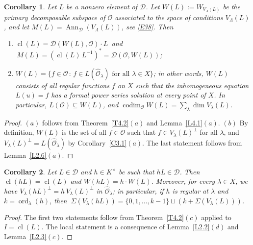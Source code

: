 \documentclass[11pt,reqno]{amsart}
\theoremstyle{plain}
\newtheorem{corollary}{Corollary}[section]
\theoremstyle{definition}
\theoremstyle{remark}
\numberwithin{equation}{section}
\newcommand{\cD}{\mathcal{D}}
\newcommand{\cO}{\mathcal{O}}
\newcommand{\hO}{\widehat{\cO}}
\DeclareMathOperator{\Ann}{Ann}
\DeclareMathOperator{\cl}{cl}
\DeclareMathOperator{\ord}{ord}
\DeclareMathOperator{\codim}{codim}
\begin{document}
\begin{corollary}
\label{C4.1}
Let $L$ be a nonzero element of $\cD$. Let $W(L) := W_{V_\Lambda(L)}$ be the primary decomposable
subspace of $\cO$ associated to the space of conditions $V_\Lambda(L)$, and let
$M(L) = \Ann_{\cD}(V_\Lambda(L))$, see \eqref{E38}. Then
\begin{enumerate}
\item[$(a)$] $\cl(L) = \cD(W(L), \cO) \cdot L\,$ and $\,M(L) = (\cl(L)\, L^{-1})^* = \cD(\cO, W(L))$;
\item[$(b)$] $W(L) = \{ f \in \cO \, : \, f \in L(\hO_\lambda) \text{ for all } \lambda \in X \}$;
in other words, $W(L)$ consists of all regular functions $f$ on $X$ such that the inhomogeneous
equation $L(u) = f$ has a formal power series solution at every point of $X$. In particular,
$L(\cO) \subseteq W(L)$, and $\codim_{\cO} W(L) = \sum_{\lambda} \dim V_\lambda(L)$.
\end{enumerate}
\end{corollary}

\begin{proof}
$(a)$ follows from Theorem~\ref{T4.2}$(a)$ and Lemma~\ref{L4.1}$(a)$. $(b)$ By definition,
$W(L)$ is the set of all $f \in \cO$ such that $f \in V_\lambda(L)^\perp$ for all $\lambda$, and
$V_\lambda(L)^\perp = L(\hO_\lambda)$ by Corollary~\ref{C3.1}$(a)$. The last statement follows
from Lemma~\ref{L2.6}$(a)$.
\end{proof}

\begin{corollary}
\label{C4.2}
Let $L \in \cD$ and $h \in K^\times$ be such that $h L \in \cD$. Then $\cl(hL) = \cl(L)$ and
$W(hL) = h \cdot W(L)$. Moreover, for every $\lambda \in X$, we have $V_\lambda(hL)^\perp = h\,
V_\lambda(L)^\perp$ in $\hO_\lambda$; in particular, if $h$ is regular at $\lambda$ and
$k = \ord_\lambda(h)$, then
$\ \Sigma(V_\lambda(hL)) = \{0, 1, \ldots, k-1\} \sqcup (k + \Sigma(V_\lambda(L)))$.
\end{corollary}

\begin{proof}
The first two statements follow from Theorem~\ref{T4.2}$(c)$ applied to $I = \cl(L)$. The local
statement is a consequence of Lemma~\ref{L2.2}$(d)$ and Lemma~\ref{L2.3}$(c)$.
\end{proof}
\end{document}
